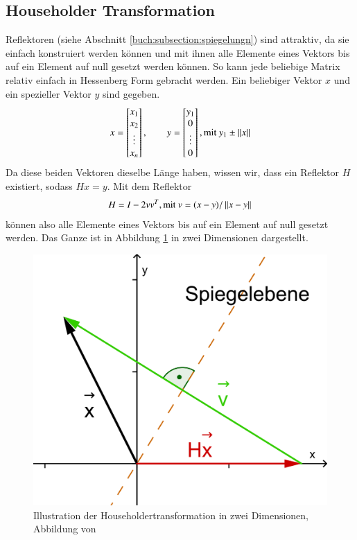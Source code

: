 \subsection{Householder Transformation\label{francis:section:grundlagen:householder}}
Reflektoren (siehe Abschnitt \ref{buch:subsection:spiegelungn}) sind attraktiv, da sie einfach konstruiert werden können und mit ihnen alle Elemente eines Vektors bis auf ein Element auf null gesetzt werden können.
So kann jede beliebige Matrix relativ einfach in Hessenberg Form gebracht werden.
Ein beliebiger Vektor $x$ und ein spezieller Vektor $y$ sind gegeben.
\begin{equation}
	x=
	\begin{bmatrix}
	x_{1}\\
	x_{2}\\
	\vdots\\
	x_{n}\\
	\end{bmatrix}
	,\qquad y=
	\begin{bmatrix}
	y_{1}\\
	0\\
	\vdots\\
	0\\
	\end{bmatrix}, \text{mit } y_{1}\pm \left\lVert x\right\rVert	
\end{equation}
Da diese beiden Vektoren dieselbe Länge haben, wissen wir, dass ein Reflektor $H$ existiert, sodass $Hx=y$.
Mit dem Reflektor
\begin{equation}
	H=I-2vv^{T}, \text{mit } v=(x-y)/\left\lVert x-y\right\rVert
\end{equation}
können also alle Elemente eines Vektors bis auf ein Element auf null gesetzt werden.
Das Ganze ist in Abbildung \ref{francis:abb:householder_transform} in zwei Dimensionen dargestellt.
\begin{figure}
	\begin{center}
		\includegraphics[scale=0.1]{papers/francis/images/Householdertransformation.png}
		\caption{Illustration der Householdertransformation in zwei Dimensionen, Abbildung von \cite{francis:householder}}
		\label{francis:abb:householder_transform}
	\end{center}
\end{figure}
